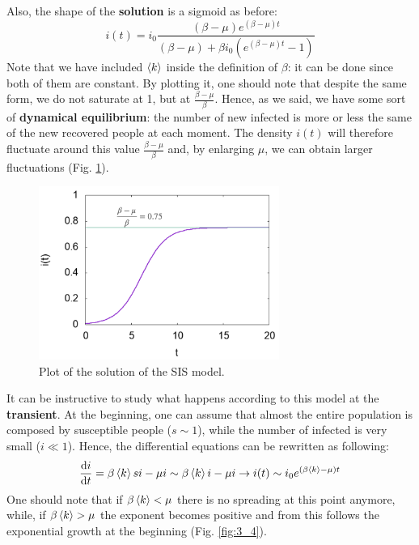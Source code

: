 \documentclass[../main/main.tex]{subfiles}
\begin{document}
Also, the shape of the \textbf{solution} is a sigmoid as before:
\begin{equation}
  i(t) = i_0 \frac{(\beta - \mu ) e^{(\beta - \mu )t} }{(\beta - \mu)  + \beta i_0 (e^{(\beta - \mu )t} - 1) }
\end{equation}
Note that we have included $\expval{k}$ inside the definition of $\beta$: it can be done since both of them are constant. By plotting it, one should note that despite the same form, we do not saturate at 1, but at $ \frac{\beta - \mu }{\beta } $. Hence, as we said, we have some sort of \textbf{dynamical equilibrium}: the number of new infected is more or less the same of the new recovered people at each moment. The density $i(t)$ will therefore fluctuate around this value $\frac{\beta - \mu }{\beta }$ and, by enlarging \( \mu  \), we can obtain larger fluctuations (Fig. \ref{fig:3_3}).
\begin{figure}[h!]
\centering
\includegraphics[width=0.7\textwidth]{../lessons/image/03/3.png}
\caption{\label{fig:3_3} Plot of the solution of the SIS model.}
\end{figure}

It can be instructive to study what happens according to this model at the \textbf{transient}. At the beginning, one can assume that almost the entire population is composed by susceptible  people ($ s \sim 1 $), while the number of infected is very small ($ i \ll 1 $).
Hence, the differential equations can be rewritten as following:
\begin{equation}
  \dv{i}{t} = \beta \expval{k} s i - \mu i \sim \beta \expval{k} i - \mu i \rightarrow i(t) \sim i_0 e^{(\beta \expval{k} - \mu  )t}
  \label{eqn:rho_dt}
\end{equation}
One should note that if \( \beta \expval{k} < \mu   \) there is no spreading at this point anymore, while, if \( \beta \expval{k} > \mu   \) the exponent becomes positive and from this follows the exponential growth at the beginning (Fig. \ref{fig:3_4}).
\end{document}
